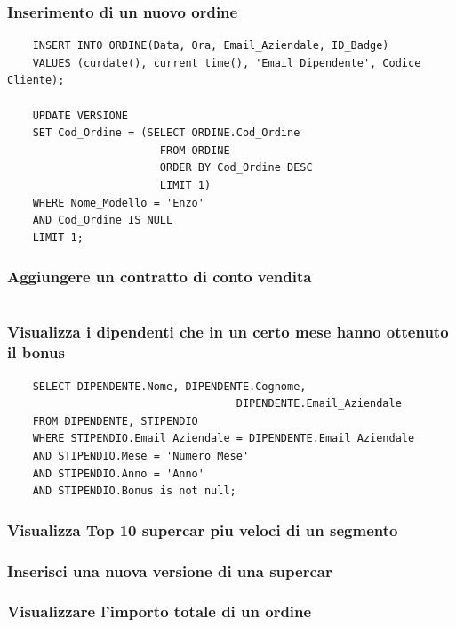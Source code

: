 \documentclass[11pt]{article}
\begin{document}
\subsubsection*{Inserimento di un nuovo ordine}
\begin{lstlisting}
    INSERT INTO ORDINE(Data, Ora, Email_Aziendale, ID_Badge) 
    VALUES (curdate(), current_time(), 'Email Dipendente', Codice Cliente);

    UPDATE VERSIONE
    SET Cod_Ordine = (SELECT ORDINE.Cod_Ordine
                        FROM ORDINE
                        ORDER BY Cod_Ordine DESC
                        LIMIT 1)
    WHERE Nome_Modello = 'Enzo'
    AND Cod_Ordine IS NULL
    LIMIT 1;
\end{lstlisting}

\subsubsection*{Aggiungere un contratto di conto vendita}
\begin{lstlisting}

\end{lstlisting}

\subsubsection*{Visualizza i dipendenti che in un certo mese hanno ottenuto il
bonus}

\begin{lstlisting}
    SELECT DIPENDENTE.Nome, DIPENDENTE.Cognome, 
                                    DIPENDENTE.Email_Aziendale 
    FROM DIPENDENTE, STIPENDIO
    WHERE STIPENDIO.Email_Aziendale = DIPENDENTE.Email_Aziendale
    AND STIPENDIO.Mese = 'Numero Mese'
    AND STIPENDIO.Anno = 'Anno'
    AND STIPENDIO.Bonus is not null;
\end{lstlisting}

\subsubsection*{Visualizza Top 10 supercar piu veloci di un segmento}

\subsubsection*{Inserisci una nuova versione di una supercar}

\subsubsection*{Visualizzare l’importo totale di un ordine}
\end{document}
